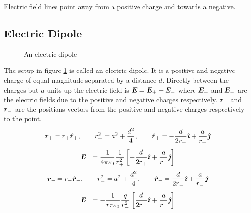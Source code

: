 \documentclass{article}
\begin{document}
    Electric field lines point away from a positive charge and towards a negative.
    
    \subsection{Electric Dipole}
    \begin{figure}[ht]
        \centering
        \caption{An electric dipole}
        \label{fig:electric dipole}
    \end{figure}
    The setup in figure \ref{fig:electric dipole} is called an electric dipole.
    It is a positive and negative charge of equal magnitude separated by a distance \(d\).
    Directly between the charges but \(a\) units up the electric field is \(\bm{E} = \bm{E}_+ + \bm{E}_-\) where \(\bm{E}_+\) and \(\bm{E}_-\) are the electric fields due to the positive and negative charges respectively.
    \(\bm{r}_+\) and \(\bm{r}_-\) are the positions vectors from the positive and negative charges respectively to the point.
    \[\bm{r}_+ = r_+\bm{\hat{r}}_+,\qquad r_+^2 = a^2 + \frac{d^2}{4},\qquad \bm{\hat{r}}_+ = -\frac{d}{2r_+}\bm{\hat{\imath}} + \frac{a}{r_+}\bm{\hat{\jmath}}\]
    \[\bm{E}_+ = \frac{1}{4\pi\varepsilon_0}\frac{1}{r_+^2}\left[-\frac{d}{2r_+}\bm{\hat{\imath}} + \frac{a}{r_+}\bm{\hat{\jmath}}\right]\]
    \[\bm{r}_- = r_-\bm{\hat{r}}_-,\qquad r_-^2 = a^2 + \frac{d^2}{4},\qquad \bm{\hat{r}}_- = \frac{d}{2r_-}\bm{\hat{\imath}} + \frac{a}{r_-}\bm{\hat{\jmath}}\]
    \[\bm{E}_- = -\frac{1}{r\pi\varepsilon_0}\frac{q}{r_-^2}\left[\frac{d}{2r_-}\bm{\hat{\imath}} + \frac{a}{r_-}\bm{\hat{\jmath}}\right]\]
\end{document}
